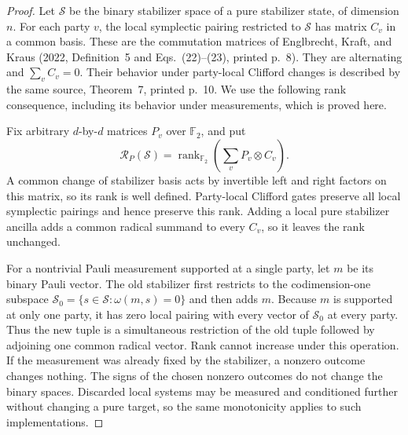 \begin{proof}
Let $\mathcal S$ be the binary stabilizer space of a pure
stabilizer state, of dimension $n$. For each party $v$, the
local symplectic pairing restricted to $\mathcal S$ has matrix
$C_v$ in a common basis. These are the commutation matrices
of Englbrecht, Kraft, and Kraus (2022, Definition~5 and
Eqs.~(22)--(23), printed p.~8). They are alternating and
$\sum_v C_v=0$. Their behavior under party-local Clifford
changes is described by the same source, Theorem~7,
printed p.~10. We use the following rank consequence, including
its behavior under measurements, which is proved here.

Fix arbitrary $d$-by-$d$ matrices $P_v$ over $\mathbb F_2$,
and put
\[
 \mathcal R_P(\mathcal S)
   =\operatorname{rank}_{\mathbb F_2}
        \left(\sum_v P_v\otimes C_v\right).
 \tag{RT-STAB-rank}
\]
A common change of stabilizer basis acts by invertible left and
right factors on this matrix, so its rank is well defined.
Party-local Clifford gates preserve all local symplectic
pairings and hence preserve this rank. Adding a local pure
stabilizer ancilla adds a common radical summand to every
$C_v$, so it leaves the rank unchanged.

For a nontrivial Pauli measurement supported at a single party,
let $m$ be its binary Pauli vector. The old stabilizer first
restricts to the codimension-one subspace
$\mathcal S_0=\{s\in\mathcal S:\omega(m,s)=0\}$ and then adds
$m$. Because $m$ is supported at only one party, it has zero
local pairing with every vector of $\mathcal S_0$ at every
party. Thus the new tuple is a simultaneous restriction of the
old tuple followed by adjoining one common radical vector.
Rank cannot increase under this operation. If the measurement
was already fixed by the stabilizer, a nonzero outcome changes
nothing. The signs of the chosen nonzero outcomes do not change
the binary spaces. Discarded local systems may be measured and
conditioned further without changing a pure target, so the
same monotonicity applies to such implementations.


\end{proof}
